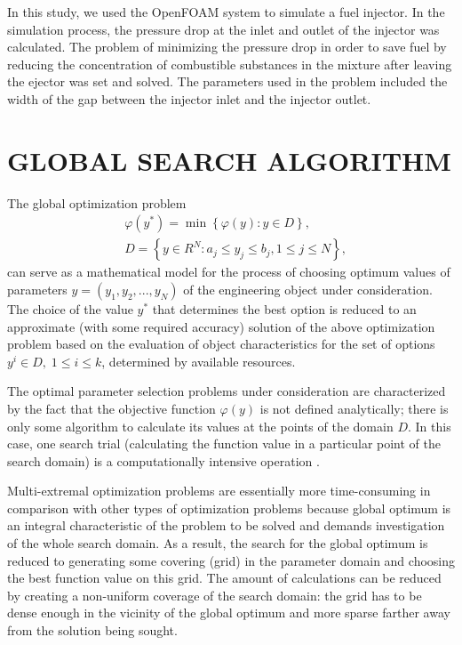 \documentclass{aip-cp}
\begin{document}
In this study, we used the OpenFOAM system to simulate a fuel injector. In the simulation process, the pressure drop at the inlet and outlet of the injector was calculated. The problem of minimizing the pressure drop in order to save fuel by reducing the concentration of combustible substances in the mixture after leaving the ejector was set and solved. The parameters used in the problem included the width of the gap between the injector inlet and the injector outlet.

\section{GLOBAL SEARCH ALGORITHM}


The global optimization problem
\begin{eqnarray}\label{problem}
&\varphi(y^\ast)=\min{\left\{\varphi(y):y\in D\right\}},\\
&D=\left\{y\in R^N: a_j\leq y_j \leq b_j, 1\leq j \leq N \right\},\label{D}
\end{eqnarray}
can serve as a mathematical model for the process of choosing optimum values of parameters $y=(y_1,y_2,...,y_N)$ of the engineering object under consideration.
The choice of the value  $y^*$ that determines the best option  is reduced to an approximate (with some required accuracy) solution of the above optimization problem based on the evaluation of object characteristics for the set of options $y^i\in D, \; 1 \leq i \leq k$, determined by available resources.

The optimal parameter selection problems under consideration are characterized by the fact that the objective function $\varphi(y)$ is not defined analytically; there is only some algorithm to calculate its values at the points of the domain $D$.  In this case, one search trial (calculating the function value in a particular point of the search domain) is a computationally intensive operation \cite{Sergeyev1999,Kvasov2013,Kalyulin2017,Sergeyev2018,Paulavicius2020,Lera2021}.

Multi-extremal optimization problems are essentially more time-consuming in comparison with other types of optimization problems because global optimum is an integral characteristic of the problem to be solved and demands investigation of the whole search domain. As a result, the search for the global optimum is reduced to generating  some covering (grid) in the parameter domain and choosing the best function value on this grid. The amount of calculations can be reduced by creating a non-uniform coverage of the search domain: the grid has to be dense enough in the vicinity of the global optimum and more sparse farther away from the solution being sought.
\end{document}
